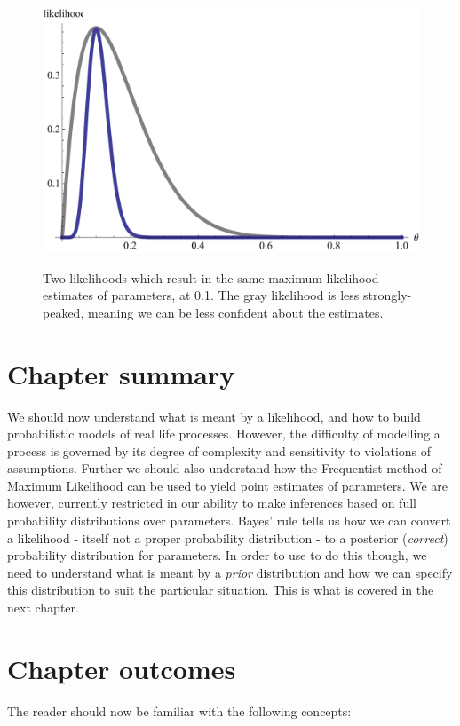 \documentclass[11pt,fullpage]{book}
\begin{document}
\begin{figure}
\centering
\scalebox{0.65} 
{\includegraphics{Likelihood_likelihoodCurvature.pdf}}
\caption{Two likelihoods which result in the same maximum likelihood estimates of parameters, at 0.1. The gray likelihood is less strongly-peaked, meaning we can be less confident about the estimates.}\label{fig:Likelihood_likelihoodCurvature}
\end{figure}


\section{Chapter summary}
We should now understand what is meant by a likelihood, and how to build probabilistic models of real life processes. However, the difficulty of modelling a process is governed by its degree of complexity and sensitivity to violations of assumptions. Further we should also understand how the Frequentist method of Maximum Likelihood can be used to yield point estimates of parameters. We are however, currently restricted in our ability to make inferences based on full probability distributions over parameters. Bayes' rule tells us how we can convert a likelihood - itself not a proper probability distribution - to a posterior (\textit{correct}) probability distribution for parameters. In order to use to do this though, we need to understand what is meant by a \textit{prior} distribution and how we can specify this distribution to suit the particular situation. This is what is covered in the next chapter.

\section{Chapter outcomes}
The reader should now be familiar with the following concepts:
\end{document}
